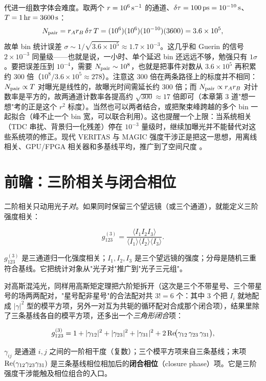 代进一组数字体会难度。取两个 \(r=10^{6}\,{\rm s^{-1}}\) 的通道、\(\delta\tau=100\,{\rm ps}=10^{-10}\,{\rm s}\)、\(T=1\,{\rm hr}=3600\,{\rm s}\)：
\[
  N_{\rm pair}=r_Ar_B\,\delta\tau\,T
  =(10^6)(10^6)(10^{-10})(3600)
  =3.6\times10^{5},
\]
故单 bin 统计误差 \(\sigma\sim1/\sqrt{3.6\times10^5}\approx1.7\times10^{-3}\)。这几乎和 Guerin 的信号 \(2\times10^{-3}\) 同量级——也就是说，一小时、单个延迟 bin 还远远不够，勉强只有 \(1\sigma\)。要把误差压到 \(10^{-4}\)，需要 \(N_{\rm pair}\sim10^{8}\)，也就是把事件对数从 \(3.6\times10^5\) 再积累约 \(300\) 倍（\(10^8/3.6\times10^5\approx278\)）。注意这 300 倍在两条路径上的标度并不相同：\(N_{\rm pair}\propto T\) 对曝光是线性的，故曝光时间需延长约 \(300\) 倍；而 \(N_{\rm pair}\propto r_Ar_B\) 对计数率是平方的，故两通道计数率各提高约 \(\sqrt{300}\approx17\) 倍即可（本章第 3 道"想一想"考的正是这个 \(r^2\) 标度）。当然也可以两者结合，或把聚束峰跨越的多个 bin 一起拟合（峰不止一个 bin 宽，可以联合利用）。这也提醒一个上限：当系统相关（TDC 串扰、背景归一化残差）停在 \(10^{-3}\) 量级时，继续加曝光并不能替代对这些系统项的修正。现代 VERITAS 与 MAGIC 强度干涉正是把这一思想，用离线相关、GPU/FPGA 相关器和多基线平均，推广到了空间尺度 \citep{2020NatAs...4.1164A,2024MNRAS.529.4387A}。

\section{前瞻：三阶相关与闭合相位}
\label{sec:e08-g3}

二阶相关只动用光子\emph{对}。如果同时保留三个望远镜（或三个通道），就能定义三阶强度相关：

\begin{equation}
  g^{(3)}_{123}=\frac{\big\langle I_1 I_2 I_3\big\rangle}
  {\big\langle I_1\big\rangle\big\langle I_2\big\rangle\big\langle I_3\big\rangle}.
  \label{eq:e08-g3}
\end{equation}
\begin{formulaexplain}
\(g^{(3)}_{123}\) 是三通道归一化强度相关；\(I_1,I_2,I_3\) 是三个望远镜的强度；分母是随机三重符合基线。它把统计对象从"光子对"推广到"光子三元组"。
\end{formulaexplain}

对高斯混沌光，同样用高斯矩定理把六阶矩拆开（这次是三个不带星号、三个带星号的场两两配对，"星号配非星号"的合法配对共 \(3!=6\) 个：其中 3 个把 \(I_i\) 就地配成 \(|\gamma|^2\) 型的模平方项，另外一对互为共轭的循环配对合成那个闭合项），结果里除了三条基线各自的模平方项，还多出一个\emph{三角形闭合}项：

\begin{equation}
  g^{(3)}_{123}=1+|\gamma_{12}|^2+|\gamma_{23}|^2+|\gamma_{31}|^2
  +2\,{\rm Re}\!\big(\gamma_{12}\,\gamma_{23}\,\gamma_{31}\big),
  \label{eq:e08-g3-closure}
\end{equation}
\begin{formulaexplain}
\(\gamma_{ij}\) 是通道 \(i,j\) 之间的一阶相干度（复数）；三个模平方项来自三条基线；末项 \({\rm Re}(\gamma_{12}\gamma_{23}\gamma_{31})\) 是三条基线相位相加后的\textbf{闭合相位}（closure phase）项。它是三阶强度干涉能触及相位组合的入口。
\end{formulaexplain}

